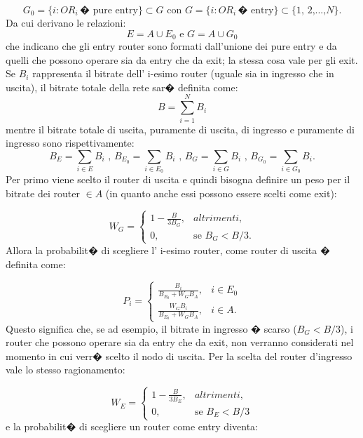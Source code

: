 \begin{equation}
 G_{0}=\{i: OR_{i} \, \text{� pure entry}\} \subset G \text{ con } G=\{i: OR_{i} \, \text{� entry}\} \subset \{\text{$1$, $2$,...,$N$}\}.
\end{equation}
 Da cui derivano le relazioni:
\begin{equation}
E=A \cup E_{0} \text{ e } G=A \cup G_{0}
\end{equation}
che indicano che gli entry router sono formati dall'unione dei pure entry e da quelli che possono operare sia da entry che da exit; la stessa cosa vale per gli exit.
Se $B_{i}$ rappresenta il bitrate dell' i-esimo router (uguale sia in ingresso che in uscita), il bitrate totale della rete sar� definita come:
\begin{equation}
B=\sum_{i=1}^N B_{i}
\end{equation}
mentre il bitrate totale di uscita, puramente di uscita, di ingresso e puramente di ingresso sono rispettivamente:
\[
B_{E}=\sum_{i\in E}B_{i} \text{ , } B_{E_0}=\sum_{i\in E_0}B_{i} \text{ , } B_{G}=\sum_{i\in G}B_{i} \text{ , } B_{G_0}=\sum_{i\in G_0}B_{i} \text{.}
\]
Per primo viene scelto il router di uscita e quindi bisogna definire un peso per il bitrate dei router $\in A$ (in quanto anche essi possono essere scelti come exit):

\begin{equation}
\label{eqn:wgpath}
W_G=
\begin{cases}
1-\frac{B}{3B_G},      	& \text{$altrimenti$,} \\
0, 									& \text{se $B_G < B/3$.}
\end{cases}
\end{equation}
Allora la probabilit� di scegliere l' i-esimo router, come router di uscita � definita come:

\begin{equation}
P_i=
\begin{cases}
\frac{B_i}{B_{E_{0}}+W_G B_A},      	& i \in E_0 \\
\frac{W_G B_i}{B_{E_{0}}+W_G B_A}, 	& i \in A.
\end{cases}
\end{equation}
Questo significa che, se ad esempio, il bitrate in ingresso � scarso ($B_G < B/3$), i router che possono operare sia da entry che da exit, non verranno considerati nel momento in cui verr� scelto il nodo di uscita. Per la scelta del router d'ingresso vale lo stesso ragionamento:

\begin{equation}
\label{eqn:wepath}
W_E=
\begin{cases}
1-\frac{B}{3B_E},      	& \text{$altrimenti$,} \\
0, 									& \text{se $B_E < B/3$}
\end{cases}
\end{equation}
e la probabilit� di scegliere un router come entry diventa:

